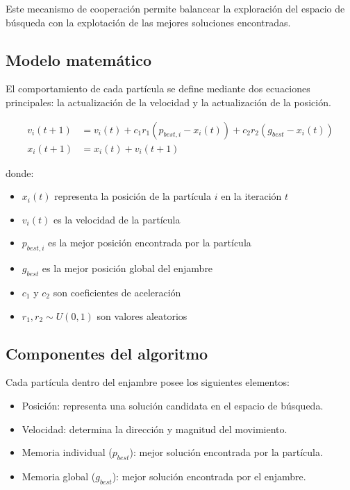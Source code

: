\documentclass[12pt]{article}
\begin{document}
Este mecanismo de cooperación permite balancear la exploración del
espacio de búsqueda con la explotación de las mejores soluciones encontradas.

\subsection{Modelo matemático}

El comportamiento de cada partícula se define mediante dos ecuaciones
principales: la actualización de la velocidad y la actualización de la posición.

\begin{align}
  v_i(t+1) &= v_i(t) + c_1 r_1 (p_{best,i} - x_i(t)) + c_2 r_2
  (g_{best} - x_i(t)) \\
  x_i(t+1) &= x_i(t) + v_i(t+1)
\end{align}

donde:
\begin{itemize}
  \item $x_i(t)$ representa la posición de la partícula $i$ en la iteración $t$
  \item $v_i(t)$ es la velocidad de la partícula
  \item $p_{best,i}$ es la mejor posición encontrada por la partícula
  \item $g_{best}$ es la mejor posición global del enjambre
  \item $c_1$ y $c_2$ son coeficientes de aceleración
  \item $r_1, r_2 \sim U(0,1)$ son valores aleatorios
\end{itemize}

\subsection{Componentes del algoritmo}

Cada partícula dentro del enjambre posee los siguientes elementos:

\begin{itemize}
  \item Posición: representa una solución candidata en el espacio de búsqueda.
  \item Velocidad: determina la dirección y magnitud del movimiento.
  \item Memoria individual ($p_{best}$): mejor solución encontrada
    por la partícula.
  \item Memoria global ($g_{best}$): mejor solución encontrada por el enjambre.
\end{itemize}
\end{document}

